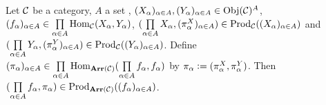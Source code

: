 \documentclass{book}
\begin{document}
	
	\begin{ex}
		Let $\mathcal{C}$ be a category, $A$ a set , $(X_{\alpha})_{\alpha \in A}, (Y_{\alpha})_{\alpha \in A} \in \operatorname{Obj}(\mathcal{C})^A$, $(f_{\alpha})_{\alpha \in A} \in \prod\limits_{\alpha \in A} \operatorname{Hom}_{\mathcal{C}}(X_{\alpha}, Y_{\alpha})$, $(\prod\limits_{\alpha \in A} X_{\alpha}, (\pi^X_{\alpha})_{\alpha \in A}) \in \operatorname{Prod}_{\mathcal{C}}((X_{\alpha})_{\alpha \in A})$ and $(\prod\limits_{\alpha \in A} Y_{\alpha}, (\pi^Y_{\alpha})_{\alpha \in A}) \in \operatorname{Prod}_{\mathcal{C}}((Y_{\alpha})_{\alpha \in A})$. Define $(\pi_{\alpha})_{\alpha \in A} \in  \prod\limits_{\alpha \in A}\operatorname{Hom}_{\operatorname{\textbf{Arr}}(\mathcal{C})}(\prod\limits_{\alpha \in A} f_{\alpha}, f_{\alpha})$ by $\pi_{\alpha} \vcentcolon= (\pi^X_{\alpha}, \pi^Y_{\alpha})$. Then  $(\prod\limits_{\alpha \in A} f_{\alpha}, \pi_{\alpha}) \in \operatorname{Prod}_{\operatorname{\textbf{Arr}}(\mathcal{C})}((f_{\alpha})_{\alpha \in A})$.
	\end{ex}
	
\end{document}
